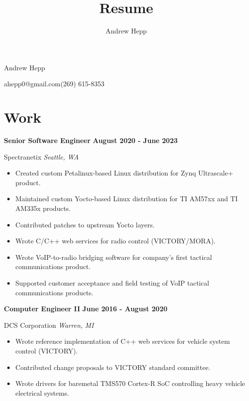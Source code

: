 \documentclass{article}
\title{Resume}
\author{Andrew Hepp}
\newcommand{\experience}[4]{
    \noindent \textbf{#1} \hfill \textbf{#2} \par
    \noindent #3 \hfill \textit{#4} \par
}
\begin{document}
    \begin{center}
       \Huge Andrew Hepp \normalsize
    \end{center}
    ahepp0@gmail.com\hfill(269) 615-8353

    \section*{Work}
        \experience{Senior Software Engineer}{August 2020 - June 2023}{Spectranetix}{Seattle, WA}
        \begin{itemize}
            \item Created custom Petalinux-based Linux distribution for Zynq Ultrascale+ product.
            \item Maintained custom Yocto-based Linux distribution for TI AM57xx and TI AM335x products.
            \item Contributed patches to upstream Yocto layers.
            \item Wrote C/C++ web services for radio control (VICTORY/MORA).
            \item Wrote VoIP-to-radio bridging software for company's first tactical communications product.
            \item Supported customer acceptance and field testing of VoIP tactical communications products.
        \end{itemize}

        \experience{Computer Engineer II}{June 2016 - August 2020}{DCS Corporation}{Warren, MI}
        \begin{itemize}
            \item Wrote reference implementation of C++ web services for vehicle system control (VICTORY).
            \item Contributed change proposals to VICTORY standard committee.
            \item Wrote drivers for baremetal TMS570 Cortex-R SoC controlling heavy vehicle electrical systems.
        \end{itemize}
\end{document}
